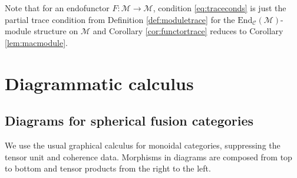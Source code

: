 \documentclass[1.5pt, a4paper]{article}
\newcommand{\mac}{\mathcal C}
\newcommand{\mam}{\mathcal M}
\newcommand{\End}{\mathrm{End}}
\begin{document}
Note that for an endofunctor $F:\mam\to\mam$, condition \eqref{eq:traceconds} is just the partial trace condition from Definition \ref{def:moduletrace} for the  $\End_\mac(\mam)$-module structure on $\mam$ and  Corollary \ref{cor:functortrace} reduces to Corollary \ref{lem:macmodule}. 





\section{Diagrammatic calculus}
\label{sec:diagrams}

\subsection{Diagrams for spherical fusion categories}
We use the usual graphical calculus for monoidal categories, suppressing the tensor unit and  coherence data. Morphisms in diagrams are composed from top to bottom and tensor products  from the right to the left.  
\end{document}
